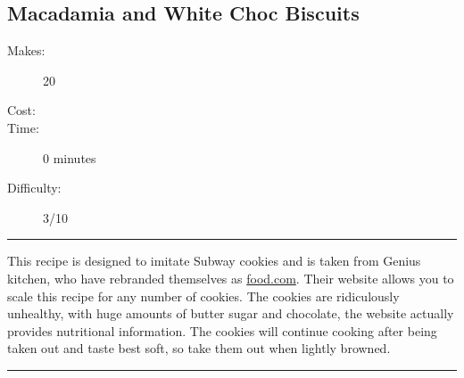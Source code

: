 \documentclass[]{article}
\begin{document}
\subsection*{\center\huge Macadamia and White Choc Biscuits}
\begin{description}
\item[Makes:] 20 
\item[Cost:] \textdollar
\item[Time:] 0 minutes
\item[Difficulty:] 3/10
\end{description}
\vspace{0.2cm}\hrule\vspace{0.5cm}
\begin{adjustwidth}{0.5 cm}{0.5 cm}

This recipe is designed to imitate Subway cookies and is taken from Genius kitchen, who have rebranded themselves as \href{https://www.food.com/recipe/subway-white-chocolate-macadamia-nut-cookies-389301?mode=US&scaleto=48}{food.com}. Their website allows you to scale this recipe for any number of cookies. The cookies are ridiculously unhealthy, with huge amounts of butter sugar and chocolate, the website actually provides nutritional information. The cookies will continue cooking after being taken out and taste best soft, so take them out when lightly browned. \hfill{}\color{black}

\end{adjustwidth}
\vspace{0.5cm}\hrule
\end{document}
